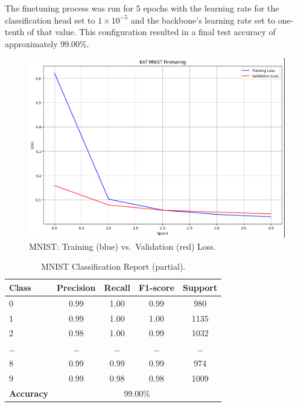 \documentclass[conference]{IEEEtran}
\begin{document}
The finetuning process was run for 5 epochs with the learning rate
for the classification head set to \(1\times10^{-5}\) and the backbone’s
learning rate set to one-tenth of that value. This configuration resulted in a
final test accuracy of approximately 99.00\%. 

\begin{figure}[H]
    \centering
    \includegraphics[width=0.65\linewidth]{mnist_train_val_loss.png}
    \caption{MNIST: Training (blue) vs.\ Validation (red) Loss.}
    \label{fig:mnist_loss}
\end{figure}

\begin{table}[H]
    \centering
    \scriptsize
    \begin{tabular}{lcccc}
        \toprule
        \textbf{Class}    & \textbf{Precision}          & \textbf{Recall} & \textbf{F1-score} & \textbf{Support} \\
        \midrule
        0                 & 0.99                        & 1.00            & 0.99              & 980              \\
        1                 & 0.99                        & 1.00            & 1.00              & 1135             \\
        2                 & 0.98                        & 1.00            & 0.99              & 1032             \\
        \ldots            & \ldots                      & \ldots          & \ldots            & \ldots           \\
        8                 & 0.99                        & 0.99            & 0.99              & 974              \\
        9                 & 0.99                        & 0.98            & 0.98              & 1009             \\
        \midrule
        \textbf{Accuracy} & \multicolumn{4}{c}{99.00\%}                                                          \\
        \bottomrule
    \end{tabular}
    \caption{MNIST Classification Report (partial).}
    \label{tab:mnist_report}
\end{table}
\end{document}
